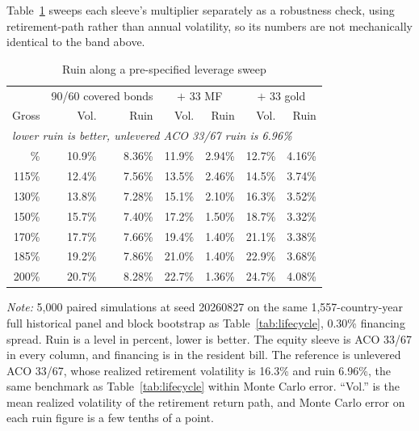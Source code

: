 \documentclass[11pt]{article}
\begin{document}
Table~\ref{tab:frontier} sweeps each sleeve's multiplier separately as a
robustness check, using retirement-path rather than annual volatility, so its
numbers are not mechanically identical to the band above.

\begin{table}[t]
\centering
\caption{Ruin along a pre-specified leverage sweep}
\label{tab:frontier}
\setlength{\tabcolsep}{5pt}
\small
\begin{tabular}{rrrrrrr}
\toprule
& \multicolumn{2}{c}{90/60 covered bonds}
& \multicolumn{2}{c}{$+$ 33 MF}
& \multicolumn{2}{c}{$+$ 33 gold} \\
Gross & Vol. & Ruin & Vol. & Ruin & Vol. & Ruin \\
\midrule
\multicolumn{7}{l}{\emph{lower ruin is better, unlevered ACO 33/67 ruin is 6.96\%}} \\
\addlinespace
100\% & 10.9\% & 8.36\% & 11.9\% & 2.94\% & 12.7\% & 4.16\% \\
115\% & 12.4\% & 7.56\% & 13.5\% & 2.46\% & 14.5\% & 3.74\% \\
130\% & 13.8\% & 7.28\% & 15.1\% & 2.10\% & 16.3\% & 3.52\% \\
150\% & 15.7\% & 7.40\% & 17.2\% & 1.50\% & 18.7\% & 3.32\% \\
170\% & 17.7\% & 7.66\% & 19.4\% & 1.40\% & 21.1\% & 3.38\% \\
185\% & 19.2\% & 7.86\% & 21.0\% & 1.40\% & 22.9\% & 3.68\% \\
200\% & 20.7\% & 8.28\% & 22.7\% & 1.36\% & 24.7\% & 4.08\% \\
\bottomrule
\end{tabular}
\begin{minipage}{0.97\textwidth}\footnotesize
\textit{Note:} 5,000 paired simulations at seed 20260827 on the same
1{,}557-country-year full historical panel and block bootstrap as
Table~\ref{tab:lifecycle}, 0.30\% financing spread. Ruin is a level in
percent, lower is better. The equity sleeve is ACO 33/67 in every column, and
financing is in the resident bill. The reference is unlevered ACO 33/67, whose
realized retirement volatility is 16.3\% and ruin 6.96\%, the same benchmark as
Table~\ref{tab:lifecycle} within Monte Carlo error. ``Vol.'' is the mean
realized volatility of the retirement return path, and Monte Carlo error on
each ruin figure is a few tenths of a point.
\end{minipage}
\end{table}
\end{document}
